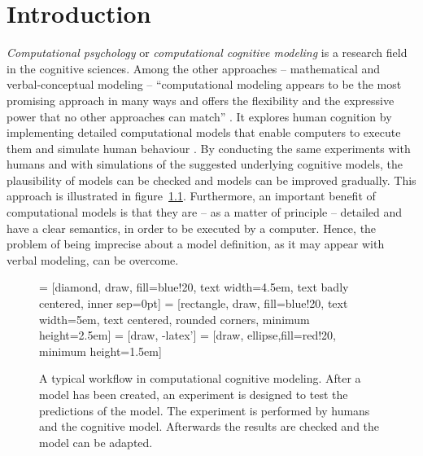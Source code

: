 \chapter{Introduction}

\emph{Computational psychology} or \emph{computational cognitive modeling} is a research field in the cognitive sciences. Among the other approaches -- mathematical and verbal-conceptual modeling -- ``computational modeling appears to be the most promising approach in many ways and offers the flexibility and the expressive power that no other approaches can match'' \cite[vii]{sun_introduction_2008}. It explores human cognition by implementing detailed computational models that enable computers to execute them and simulate human behaviour \cite[3]{sun_introduction_2008}. By conducting the same experiments with humans and with simulations of the suggested underlying cognitive models, the plausibility of models can be checked and models can be improved gradually. This approach is illustrated in figure~\ref{fig:cognitive_modeling_exp}. Furthermore, an important benefit of computational models is that they are -- as a matter of principle -- detailed and have a clear semantics, in order to be executed by a computer. Hence, the problem of being imprecise about a model definition, as it may appear with verbal modeling, can be overcome.

\begin{figure}[hbt]
\centering
 = [diamond, draw, fill=blue!20, 
    text width=4.5em, text badly centered, inner sep=0pt]
 = [rectangle, draw, fill=blue!20, 
    text width=5em, text centered, rounded corners, minimum height=2.5em]
 = [draw, -latex']
 = [draw, ellipse,fill=red!20, 
    minimum height=1.5em]
    
\caption{A typical workflow in computational cognitive modeling. After a model has been created, an experiment is designed to test the predictions of the model. The experiment is performed by humans and the cognitive model. Afterwards the results are checked and the model can be adapted. \cite{about_actr_homepage}}
\label{fig:cognitive_modeling_exp}
\end{figure}


